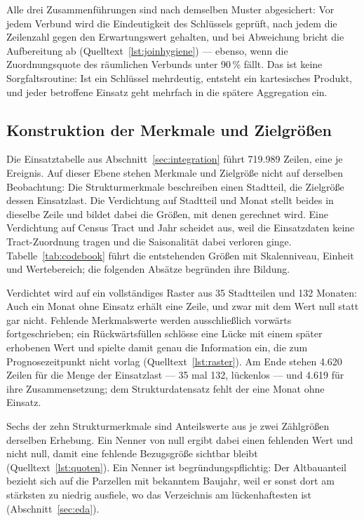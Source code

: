 Alle drei Zusammenführungen sind nach demselben Muster abgesichert: Vor jedem
Verbund wird die Eindeutigkeit des Schlüssels geprüft, nach jedem die Zeilenzahl
gegen den Erwartungswert gehalten, und bei Abweichung bricht die Aufbereitung
ab (Quelltext~\ref{lst:joinhygiene}) --- ebenso, wenn die Zuordnungsquote des
räumlichen Verbunds unter 90\,\% fällt. Das ist keine Sorgfaltsroutine: Ist ein
Schlüssel mehrdeutig, entsteht ein kartesisches Produkt, und jeder betroffene
Einsatz geht mehrfach in die spätere Aggregation ein.



\subsection{Konstruktion der Merkmale und Zielgrößen}
\label{sec:merkmale}

Die Einsatztabelle aus Abschnitt~\ref{sec:integration} führt 719.989 Zeilen,
eine je Ereignis. Auf dieser Ebene stehen Merkmale und Zielgröße nicht auf
derselben Beobachtung: Die Strukturmerkmale beschreiben einen Stadtteil, die
Zielgröße dessen Einsatzlast. Die Verdichtung auf Stadtteil und Monat stellt
beides in dieselbe Zeile und bildet dabei die Größen, mit denen gerechnet wird.
Eine Verdichtung auf Census Tract und Jahr scheidet aus, weil die Einsatzdaten
keine Tract-Zuordnung tragen und die Saisonalität dabei verloren ginge.
Tabelle~\ref{tab:codebook} führt die entstehenden Größen mit Skalenniveau,
Einheit und Wertebereich; die folgenden Absätze begründen ihre Bildung.

Verdichtet wird auf ein vollständiges Raster aus 35 Stadtteilen und 132
Monaten: Auch ein Monat ohne Einsatz erhält eine Zeile, und zwar mit dem Wert
null statt gar nicht. Fehlende Merkmalswerte werden ausschließlich vorwärts
fortgeschrieben; ein Rückwärtsfüllen schlösse eine Lücke mit einem später
erhobenen Wert und spielte damit genau die Information ein, die zum
Prognosezeitpunkt nicht vorlag (Quelltext~\ref{lst:raster}). Am Ende stehen
4.620 Zeilen für die Menge der Einsatzlast --- 35 mal 132, lückenlos --- und
4.619 für ihre Zusammensetzung; dem Strukturdatensatz fehlt der eine Monat ohne
Einsatz.

Sechs der zehn Strukturmerkmale sind Anteilswerte aus je zwei Zählgrößen
derselben Erhebung. Ein Nenner von null ergibt dabei einen fehlenden Wert und
nicht null, damit eine fehlende Bezugsgröße sichtbar bleibt
(Quelltext~\ref{lst:quoten}). Ein Nenner ist begründungspflichtig: Der
Altbauanteil bezieht sich auf die Parzellen mit bekanntem Baujahr, weil er
sonst dort am stärksten zu niedrig ausfiele, wo das Verzeichnis am
lückenhaftesten ist (Abschnitt~\ref{sec:eda}).

